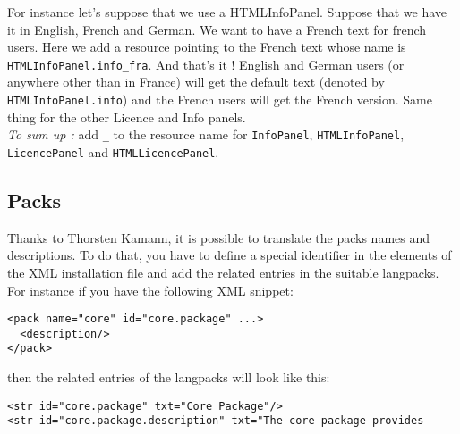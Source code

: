 For instance let's suppose that we use a HTMLInfoPanel. Suppose that we have it
in English, French and German. We want to have a French text for french users.
Here we add a resource pointing to the French text whose name is
\texttt{HTMLInfoPanel.info\_fra}. And that's it ! English and German users (or
anywhere other than in France) will get the default text (denoted by 
\texttt{HTMLInfoPanel.info}) and the French users will get the French version.
Same thing for the other Licence and Info panels.\\

\noindent
\textit{To sum up :} add \texttt{\_<iso3 code>} to the resource name for
\texttt{InfoPanel}, \texttt{HTMLInfoPanel}, \texttt{LicencePanel} and
\texttt{HTMLLicencePanel}.\\

\subsection{Packs}

Thanks to Thorsten Kamann, it is possible to translate the packs names and
descriptions. To do that, you have to define a special identifier in the
elements of the XML installation file and add the related entries in the
suitable langpacks. For instance if you have the following XML snippet:
\begin{verbatim}
<pack name="core" id="core.package" ...>
  <description/>
</pack>
\end{verbatim}
then the related entries of the langpacks will look like this:
\begin{verbatim}
<str id="core.package" txt="Core Package"/>
<str id="core.package.description" txt="The core package provides
\end{verbatim}
